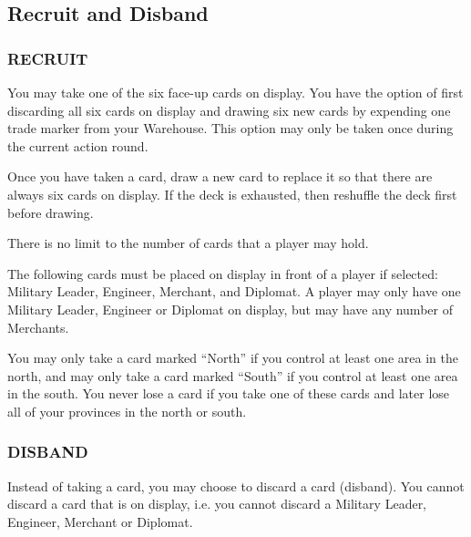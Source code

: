 \subsection{Recruit and Disband}

\subsubsection{RECRUIT}

You may take one of the six face-up cards on display. You have the option of first discarding all six cards on display and drawing six new cards by expending one trade marker from your Warehouse. This option may only be taken once during the current action round.

Once you have taken a card, draw a new card to replace it so that there are always six cards on display. If the deck is exhausted, then reshuffle the deck first before drawing.

There is no limit to the number of cards that a player may hold.

The following cards must be placed on display in front of a player if selected: Military Leader, Engineer, Merchant, and Diplomat. A player may only have one Military Leader, Engineer or Diplomat on display, but may have any number of Merchants.

You may only take a card marked “North” if you control at least one area in the north, and may only take a card marked “South” if you control at least one area in the south. You never lose a card if you take one of these cards and later lose all of your provinces in the north or south.

\subsubsection{DISBAND}

Instead of taking a card, you may choose to discard a card (disband). You cannot discard a card that is on display, i.e. you cannot discard a Military Leader, Engineer, Merchant or Diplomat.